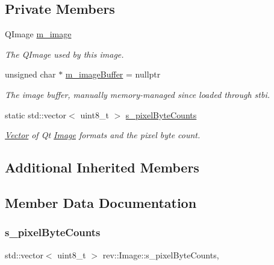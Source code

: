 \subsection*{Private Members}
\begin{DoxyCompactItemize}
\item 
\mbox{\label{classrev_1_1_image_a5d4ed99f0fbaf43ad92a2b7b68bb9ed8}} 
Q\+Image \mbox{\hyperlink{classrev_1_1_image_a5d4ed99f0fbaf43ad92a2b7b68bb9ed8}{m\+\_\+image}}
\begin{DoxyCompactList}\small\item\em The Q\+Image used by this image. \end{DoxyCompactList}\item 
\mbox{\label{classrev_1_1_image_adfb66725c0ab6d7dc5daa5854e0f3153}} 
unsigned char $\ast$ \mbox{\hyperlink{classrev_1_1_image_adfb66725c0ab6d7dc5daa5854e0f3153}{m\+\_\+image\+Buffer}} = nullptr
\begin{DoxyCompactList}\small\item\em The image buffer, manually memory-\/managed since loaded through stbi. \end{DoxyCompactList}\item 
static std\+::vector$<$ uint8\+\_\+t $>$ \mbox{\hyperlink{classrev_1_1_image_a9bfca25daba8f98bada09ae16baaa5f7}{s\+\_\+pixel\+Byte\+Counts}}
\begin{DoxyCompactList}\small\item\em \mbox{\hyperlink{classrev_1_1_vector}{Vector}} of Qt \mbox{\hyperlink{classrev_1_1_image}{Image}} formats and the pixel byte count. \end{DoxyCompactList}\end{DoxyCompactItemize}
\subsection*{Additional Inherited Members}


\subsection{Member Data Documentation}
\mbox{\label{classrev_1_1_image_a9bfca25daba8f98bada09ae16baaa5f7}} 
\subsubsection{\texorpdfstring{s\_pixelByteCounts}{s\_pixelByteCounts}}
{\footnotesize\ttfamily std\+::vector$<$ uint8\+\_\+t $>$ rev\+::\+Image\+::s\+\_\+pixel\+Byte\+Counts\hspace{0.3cm}{\ttfamily [static]}, {\ttfamily [protected]}}



